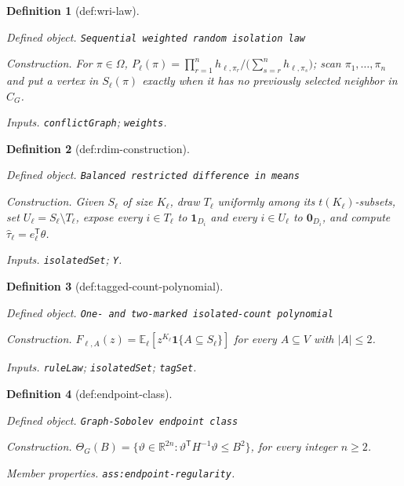 \documentclass{article}
\newtheorem{definition}{Definition}
\begin{document}
\begin{definition}[def:wri-law]\label{def:wri-law}
\par\smallskip\noindent\emph{Defined object.} \texttt{Sequential weighted random isolation law}
\par\smallskip\noindent\emph{Construction.} For \(\pi\in\Omega\), \(P_{\ell}(\pi)=\prod_{r=1}^{n}h_{\ell,\pi_r}/\bigl(\sum_{s=r}^{n}h_{\ell,\pi_s}\bigr)\); scan \(\pi_1,\ldots,\pi_n\) and put a vertex in \(S_{\ell}(\pi)\) exactly when it has no previously selected neighbor in \(C_G\).
\par\smallskip\noindent\emph{Inputs.} \texttt{conflictGraph}; \texttt{weights}.
\end{definition}

\begin{definition}[def:rdim-construction]\label{def:rdim-construction}
\par\smallskip\noindent\emph{Defined object.} \texttt{Balanced restricted difference in means}
\par\smallskip\noindent\emph{Construction.} Given \(S_{\ell}\) of size \(K_{\ell}\), draw \(T_{\ell}\) uniformly among its \(t(K_{\ell})\)-subsets, set \(U_{\ell}=S_{\ell}\setminus T_{\ell}\), expose every \(i\in T_{\ell}\) to \(\mathbf 1_{D_i}\) and every \(i\in U_{\ell}\) to \(\mathbf 0_{D_i}\), and compute \(\widehat\tau_{\ell}=e_{\ell}^{\mathsf T}\theta\).
\par\smallskip\noindent\emph{Inputs.} \texttt{isolatedSet}; \texttt{Y}.
\end{definition}

\begin{definition}[def:tagged-count-polynomial]\label{def:tagged-count-polynomial}
\par\smallskip\noindent\emph{Defined object.} \texttt{One-\allowbreak{} and two-\allowbreak{}marked isolated-\allowbreak{}count polynomial}
\par\smallskip\noindent\emph{Construction.} \(F_{\ell,A}(z)=\mathbb E_{\ell}[z^{K_{\ell}}\mathbf 1\{A\subseteq S_{\ell}\}]\) for every \(A\subseteq V\) with \(|A|\le 2\).
\par\smallskip\noindent\emph{Inputs.} \texttt{ruleLaw}; \texttt{isolatedSet}; \texttt{tagSet}.
\end{definition}

\begin{definition}[def:endpoint-class]\label{def:endpoint-class}
\par\smallskip\noindent\emph{Defined object.} \texttt{Graph-\allowbreak{}Sobolev endpoint class}
\par\smallskip\noindent\emph{Construction.} \(\Theta_G(B)=\{\vartheta\in\mathbb R^{2n}:\vartheta^{\mathsf T}H^{-1}\vartheta\le B^{2}\}\), for every integer \(n\ge2\).
\par\smallskip\noindent\emph{Member properties.} \texttt{ass:\allowbreak{}endpoint-\allowbreak{}regularity}.
\end{definition}
\end{document}
